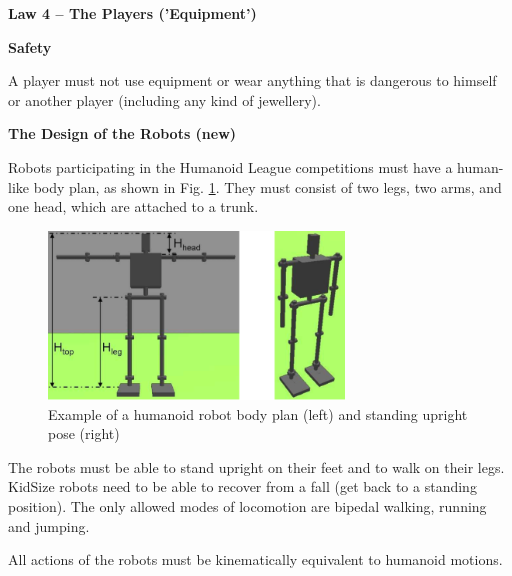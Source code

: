 \clearpage
\sffamily
{\bfseries\color[rgb]{0.4,0.4,0.4}
Law 4 -- The Players ('Equipment')}
{}

\bigskip

{\bfseries Safety }

\headlinebox

A player must not use equipment or wear anything that is dangerous to himself or another player (including any kind of jewellery).

\bigskip

{\bfseries The Design of the Robots (new)}

\headlinebox

Robots participating in the Humanoid League competitions must have a human-like body plan, as shown in Fig. \ref{fig:bodyplan}. They must consist of two legs, two arms, and one head, which are attached to a trunk.

\bigskip



\begin{figure}[h]
\begin{center}
\includegraphics[width=0.7\textwidth]{img/bodyplan.png}
\caption{Example of a humanoid robot body plan (left) and standing upright pose (right)}
\label{fig:bodyplan}
\vspace{-3ex}
\end{center}
\end{figure}


The robots must be able to stand upright on their feet and to walk on their legs.
KidSize robots need to be able to recover from a fall
(get back to a standing position).
The only allowed modes of locomotion are bipedal walking, running and jumping.

\bigskip

All actions of the robots must be kinematically equivalent to humanoid motions.

